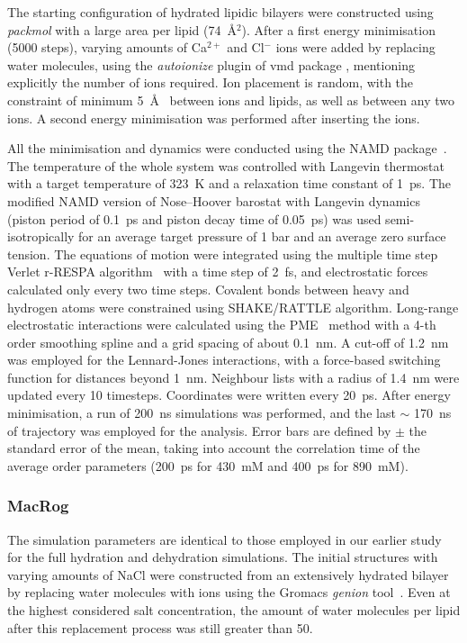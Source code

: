 \documentclass[twoside,twocolumn,9pt]{article}
\begin{document}
The starting  configuration of hydrated lipidic bilayers were constructed using {\it packmol} \cite{packmol} 
with a large area per lipid (74~\AA$^{2}$). 
After a first energy minimisation (5000 steps),
varying amounts of Ca$^{2+}$ and Cl$^-$ ions were added  by replacing water molecules,
using the {\it autoionize} plugin of vmd package \cite{hump96},
mentioning explicitly the number of ions required.
Ion placement is random, with the constraint of  minimum 5~\AA~ between ions and lipids,
as well as between any two ions. A second energy minimisation was performed after inserting the ions.
 
All the minimisation and dynamics were conducted using the NAMD package~\cite{NAMD}.
The temperature of the whole system was controlled with Langevin thermostat with a target temperature of 323~K 
and a relaxation time constant of 1~ps.  The modified NAMD version of Nose--Hoover barostat with Langevin dynamics
(piston period of 0.1~ps and piston decay time of 0.05~ps) was used semi-isotropically
for an average target pressure of 1 bar and an average zero surface tension. 
The equations of motion were integrated using the multiple time step Verlet r-RESPA algorithm~\cite{pall13}
with a time step of 2~fs, and electrostatic forces calculated only every two time steps. Covalent
bonds between heavy and hydrogen atoms were constrained using SHAKE/RATTLE algorithm.
Long-range electrostatic interactions were calculated using the PME~\cite{darden93,essman95} method 
with a 4-th order smoothing spline and a grid spacing of about 0.1~nm.
A cut-off of 1.2~nm was employed for the Lennard-Jones
interactions, with a force-based switching function for distances beyond 1~nm. Neighbour
lists with a radius of 1.4~nm were updated every 10 timesteps.
Coordinates were written every 20~ps. After energy minimisation, a run of  200~ns simulations was performed,
and the last $\sim$ 170~ns 
of  trajectory was employed for the analysis.
Error bars are defined by $\pm$ the standard error of the mean, 
taking into account the correlation time of the average order parameters 
(200~ps for 430~mM and 400~ps for 890~mM). 


\subsubsection{MacRog}
The simulation parameters are identical to those employed in our earlier study~\cite{botan15} for the full 
hydration and dehydration simulations. The initial structures with varying amounts of NaCl were constructed from an 
extensively hydrated bilayer by replacing water molecules with ions using the Gromacs {\it genion} tool~\cite{gromacsMANUAL}. Even at the highest 
considered salt concentration, the amount of water molecules per lipid after this replacement process was still greater than 50.
\end{document}
